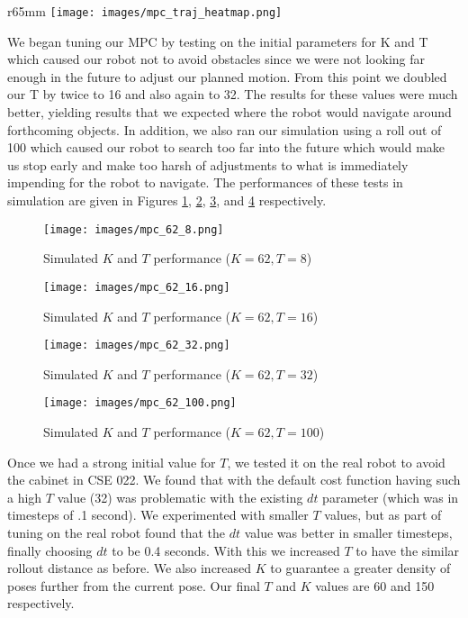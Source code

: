 \documentclass{article}
\begin{document}
\begin{wrapfigure}{r}{65mm}
  \centering
  \texttt{[image: images/mpc\_traj\_heatmap.png]}
  \caption{Our MPC Trajectories and Heatmap}
  \label{fig:mpc_traj_heatmap}
\end{wrapfigure}

We began tuning our MPC by testing on the initial parameters for K
and T which caused our robot not to avoid obstacles since we were not 
looking far enough in the future to adjust our planned motion. From this
point we doubled our T by twice to 16 and also again to 32. The results 
for these values were much better, yielding results that we expected 
where the robot would navigate around forthcoming objects. In addition, 
we also ran our simulation using a roll out of 100 which caused our robot to 
search too far into the future which would make us stop early and make too 
harsh of adjustments to what is immediately impending for the robot to navigate. 
The performances of these tests in simulation are given in Figures
\ref{fig:mpc_tune_T_orig}, \ref{fig:mpc_tune_T_16}, \ref{fig:mpc_tune_T_32},
and \ref{fig:mpc_tune_T_100} respectively.

\begin{figure}[!h]
\centering
  \texttt{[image: images/mpc\_62\_8.png]}
  \caption{Simulated $K$ and $T$ performance ($K = 62, T = 8$)}
  \label{fig:mpc_tune_T_orig}
\end{figure}

\begin{figure}
  \centering
  \texttt{[image: images/mpc\_62\_16.png]}
  \caption{Simulated $K$ and $T$ performance ($K = 62, T = 16$)}
  \label{fig:mpc_tune_T_16}
\end{figure}

\begin{figure}
  \centering
  \texttt{[image: images/mpc\_62\_32.png]}
  \caption{Simulated $K$ and $T$ performance ($K = 62, T = 32$)}
  \label{fig:mpc_tune_T_32}
\end{figure}

\begin{figure}
  \centering
  \texttt{[image: images/mpc\_62\_100.png]}
  \caption{Simulated $K$ and $T$ performance ($K = 62, T = 100$)}
  \label{fig:mpc_tune_T_100}
\end{figure}

\newpage
Once we had a strong initial value for $T$, we tested it on the real
robot to avoid the cabinet in CSE 022. We found that with the default
cost function having such a high $T$ value (32) was problematic
with the existing $dt$ parameter (which was in timesteps of .1 second).
We experimented with smaller $T$ values, but as part of tuning on the
real robot found that the $dt$ value was better in smaller timesteps,
finally choosing $dt$ to be 0.4 seconds. With this we increased $T$
to have the similar rollout distance as before. We also increased $K$
to guarantee a greater density of poses further from the current pose.
Our final $T$ and $K$ values are 60 and 150 respectively.
\end{document}
